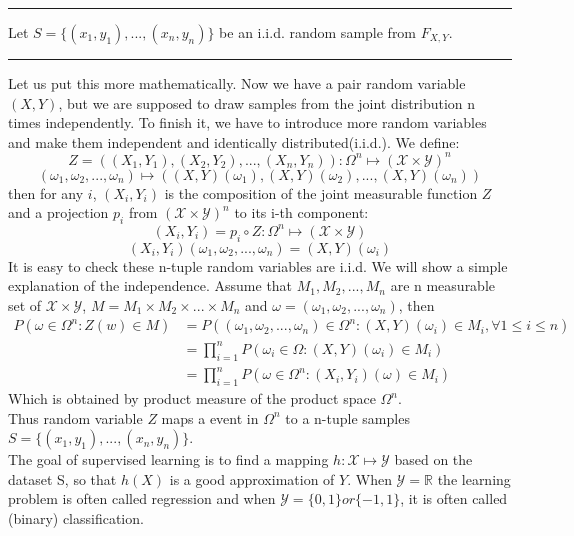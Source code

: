 \hrule 
\noindent Let $S = \{(x_1,y_1),...,(x_n,y_n) \}$ be an i.i.d. random
sample from $F_{X,Y}$. 
\hrule 

Let us put this more mathematically. Now we have a pair random variable $(X,Y)$, but we are supposed to draw samples from the joint distribution n times independently. To finish it, we have to introduce more random variables and make them independent and identically distributed(i.i.d.). We define:
\begin{equation}
Z=((X_1,Y_1), (X_2,Y_2),..., (X_n,Y_n)) :\Omega^n \mapsto (\mathcal{X}\times\mathcal{Y})^n	
\end{equation}
\begin{equation}
(\omega_1, \omega_2,..., \omega_n) \mapsto ((X,Y)(\omega_1), (X,Y)(\omega_2),..., (X,Y)(\omega_n))
\end{equation}
then for any $i$, $(X_i,Y_i)$ is the composition of the joint measurable function $Z$ and a projection $p_i$ from $(\mathcal{X}\times\mathcal{Y})^n$ to its i-th component:
\begin{equation}
(X_i,Y_i)=p_i \circ Z :\Omega^n \mapsto (\mathcal{X}\times\mathcal{Y})
\end{equation}
\begin{equation}
(X_i,Y_i)(\omega_1, \omega_2,..., \omega_n)= (X,Y)(\omega_i)
\end{equation}
It is easy to check these n-tuple random variables are i.i.d. We will show a simple explanation of the independence. Assume that $M_1, M_2,..., M_n$ are n measurable set of $\mathcal{X}\times\mathcal{Y}$, $M=M_1\times M_2\times...\times M_n$ and $\omega=(\omega_1, \omega_2,..., \omega_n)$, then
\begin{align}
P(\omega \in \Omega^n : Z(w)\in M) &= P((\omega_1, \omega_2,..., \omega_n)\in \Omega^n : (X,Y)(\omega_i) \in M_i, \forall 1\leq i \leq n ) \\
&= \prod_{i=1}^{n}P(\omega_i \in \Omega : (X,Y)(\omega_i) \in M_i) \\
&= \prod_{i=1}^{n}P(\omega \in \Omega^n : (X_i,Y_i)(\omega) \in M_i)
\end{align}
Which is obtained by  product measure of the product space $\Omega^n$. \\
\noindent Thus random variable $Z$ maps a event in $\Omega^n$ to a n-tuple samples $S = \{(x_1,y_1),...,(x_n,y_n) \}$.\\

\noindent The goal of supervised learning is to find a mapping $h:\mathcal{X}\mapsto\mathcal{Y}$  based on the dataset S, so that $h(X)$ is a good approximation of $Y$. When $\mathcal{Y}=\mathbb{R}$ the learning problem is often called regression and when $\mathcal{Y}=\{0,1\} or \{-1,1\}$, it is often called (binary) classification.\\

